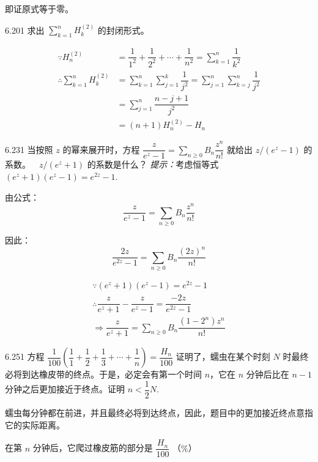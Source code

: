 即证原式等于零。

\begin{problem}{6.20}{1}
  求出 \( \sum_{k=1}^n H_k^{(2)} \) 的封闭形式。
\end{problem}

\begin{align*}
  \because H_n^{(2)} &= \dfrac{1}{1^2} + \dfrac{1}{2^2} + \cdots + \dfrac{1}{n^2} = \sum_{k=1}^n \dfrac{1}{k^2} \\
  \therefore \sum_{k=1}^n H_k^{(2)} &= \sum_{k=1}^n \sum_{j=1}^k \dfrac{1}{j^2} = \sum_{j=1}^n \sum_{k=j}^n \dfrac{1}{j^2} \\
  &= \sum_{j=1}^n \dfrac{n-j+1}{j^2} \\
  &= (n+1) H_n^{(2)} - H_n
\end{align*}

\begin{problem}{6.23}{1}
  当按照 \( z \) 的幂来展开时，方程 \( \dfrac{z}{e^z - 1} = \sum_{n \ge 0} B_n \dfrac{z^n}{n!} \) 就给出 \( z / (e^z - 1) \) 的系数。\( \quad z / (e^z + 1) \) 的系数是什么？
  \textit{提示：}考虑恒等式 \( (e^z+1)(e^z-1)=e^{2z}-1 \).
\end{problem}

由公式：
\[
  \boxed{\dfrac{z}{e^z-1} = \sum_{n \geqslant 0} B_n \dfrac{z^n}{n!}}
\]

因此：
\[
  \dfrac{2z}{e^{2z} - 1} = \sum_{n \geqslant 0} B_n \dfrac{(2z)^n}{n!}
\]

\begin{gather*}
  \because (e^z+1)(e^z-1) = e^{2z}-1 \\
  \therefore \dfrac{z}{e^z+1} - \dfrac{z}{e^z-1} = \dfrac{-2z}{e^{2z} - 1} \\
  \Rightarrow \dfrac{z}{e^z+1} = \sum_{n \geqslant 0} B_n \dfrac{(1-2^n) z^n}{n!}
\end{gather*}

\begin{problem}{6.25}{1}
  方程 \( \dfrac{1}{100} \left( \dfrac{1}{1} + \dfrac{1}{2} + \dfrac{1}{3} + \cdots + \dfrac{1}{n} \right) = \dfrac{H_n}{100} \) 证明了，蠕虫在某个时刻 \( N \) 时最终必将到达橡皮带的终点。于是，必定会有第一个时间 \( n \)，它在 \( n \) 分钟后比在 \( n-1 \) 分钟之后更加接近于终点。证明 \( n < \dfrac{1}{2} N \).
\end{problem}

蠕虫每分钟都在前进，并且最终必将到达终点，因此，题目中的更加接近终点意指它的实际距离。

在第 \( n \) 分钟后，它爬过橡皮筋的部分是 \( \dfrac{H_n}{100} \) （\( \% \)）

